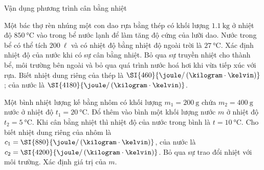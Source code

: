 \begin{dang}{Vận dụng phương trình cân bằng nhiệt}
	{Một bác thợ rèn nhúng một con dao rựa bằng thép có khối lượng $\SI{1.1}{\kilogram}$ ở nhiệt độ $\SI{850}{\celsius}$ vào trong bể nước lạnh để làm tăng độ cứng của lưỡi dao. Nước trong bể có thể tích $\SI{200}{\ell}$ và có nhiệt độ bằng nhiệt độ ngoài trời là $\SI{27}{\celsius}$. Xác định nhiệt độ của nước khi có sự cân bằng nhiệt. Bỏ qua sự truyền nhiệt cho thành bể, môi trường bên ngoài và bỏ qua quá trình nước hoá hơi khi vừa tiếp xúc với rựa. Biết nhiệt dung riêng của thép là $\SI{460}{\joule/\left(\kilogram\cdot\kelvin\right)}$; của nước là $\SI{4180}{\joule/\left(\kilogram\cdot\kelvin\right)}$.
	
}
{
}

{Một bình nhiệt lượng kế bằng nhôm có khối lượng $m_1=\SI{200}{\gram}$ chứa $m_2=\SI{400}{\gram}$ nước ở nhiệt độ $t_1=\SI{20}{\celsius}$. Đổ thêm vào bình một khối lượng nước $m$ ở nhiệt độ $t_2=\SI{5}{\celsius}$. Khi cân bằng nhiệt thì nhiệt độ của nước trong bình là $t=\SI{10}{\celsius}$. Cho biết nhiệt dung riêng của nhôm là $c_1=\SI{880}{\joule/\left(\kilogram\cdot\kelvin\right)}$, của nước là $c_2=\SI{4200}{\joule/\left(\kilogram\cdot\kelvin\right)}$. Bỏ qua sự trao đổi nhiệt với môi trường. Xác định giá trị của $m$.

}
{
}
\end{dang}